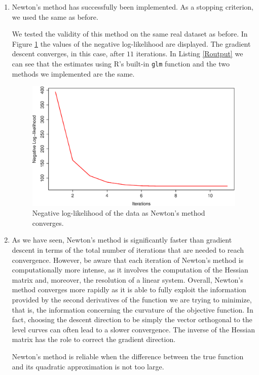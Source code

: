 \documentclass{homework}
\begin{document}
\begin{enumerate}[label=(\Alph*)]
\item Newton's method has successfully been implemented. As a stopping criterion, we used the same as before.

We tested the validity of this method on the same real dataset as before. In Figure \ref{fig:newton} the values of the negative log-likelihood are displayed. The gradient descent converges, in this case, after $11$ iterations. In Listing \ref{Routput} we can see that the estimates using R's built-in \texttt{glm} function and the two methods we implemented are the same.

\begin{figure}[!ht]
\centering
\includegraphics[width=0.6\columnwidth]{./Img/ll_2}
\caption{Negative log-likelihood of the data as Newton's method converges.}
\label{fig:newton}
\end{figure}



\item As we have seen, Newton's method is significantly faster than gradient descent in terms of the total number of iterations that are needed to reach convergence. However, be aware that each iteration of Newton's method is computationally more intense, as it involves the computation of the Hessian matrix and, moreover, the resolution of a linear system. Overall, Newton's method converges more rapidly as it is able to fully exploit the information provided by the second derivatives of the function we are trying to minimize, that is, the information concerning the curvature of the objective function. In fact, choosing the descent direction to be simply the vector orthogonal to the level curves can often lead to a slower convergence. The inverse of the Hessian matrix has the role to correct the gradient direction.

Newton's method is reliable when the difference between the true function and its quadratic approximation is not too large. 

\end{enumerate}
\end{document}
